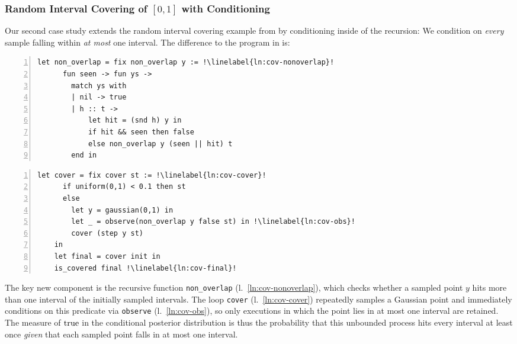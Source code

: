 \subsubsection{Random Interval Covering of \ensuremath{[0,1]} with Conditioning}
\label{sec:casestudy:epsball}

Our second case study extends the random interval covering example from   by conditioning inside of the recursion: We condition on \emph{every} sample falling within \emph{at most} one interval. The difference to the program in  is:
%
\begin{center}
\begin{minipage}[t]{0.48\textwidth}
    \vspace{0pt}
    \begin{lstlisting}[aboveskip=0.4em,belowskip=0.4em,gobble=4,
      escapechar=!,
      numbers=left,
      stepnumber=1,
      numberstyle=\color{gray}\scriptsize,
      numbersep=7pt,
      xleftmargin=12.5pt,
      xrightmargin=-12.5pt,
      basicstyle=\ttfamily\footnotesize]
    let non_overlap = fix non_overlap y := !\linelabel{ln:cov-nonoverlap}!
      fun seen -> fun ys -> 
        match ys with
        | nil -> true
        | h :: t ->
            let hit = (snd h) y in
            if hit && seen then false
            else non_overlap y (seen || hit) t
        end in
    \end{lstlisting}
    \end{minipage}
    \hfill
    \begin{minipage}[t]{0.48\textwidth}
    \vspace{0pt}
    \begin{lstlisting}[aboveskip=0.4em,belowskip=0.4em,gobble=4,
      escapechar=!,
      numbers=left,
      stepnumber=1,
      firstnumber=last,
      numberstyle=\color{gray}\scriptsize,
      numbersep=7pt,
      basicstyle=\ttfamily\footnotesize]
    let cover = fix cover st := !\linelabel{ln:cov-cover}!
      if uniform(0,1) < 0.1 then st
      else
        let y = gaussian(0,1) in
        let _ = observe(non_overlap y false st) in !\linelabel{ln:cov-obs}!
        cover (step y st)
    in
    let final = cover init in
    is_covered final !\linelabel{ln:cov-final}!
    \end{lstlisting}
\end{minipage}
\end{center}
%
\noindent
The key new component is the recursive function \lstinline{non_overlap} (l.\ \ref{ln:cov-nonoverlap}), which checks whether a sampled point $y$ hits more than one interval of the initially sampled intervals. The loop \lstinline{cover} (l.\ \ref{ln:cov-cover}) repeatedly samples a Gaussian point and immediately conditions on this predicate via \lstinline{observe} (l.\ \ref{ln:cov-obs}), so only executions in which the point lies in at most one interval are retained. The measure of $\textnormal{true}$ in the conditional posterior distribution is thus the probability that this unbounded process hits every interval at least once \emph{given} that each sampled point falls in at most one interval.


